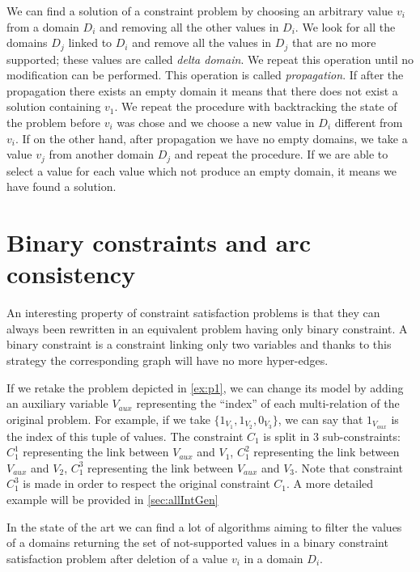 \documentclass{rapport}
\begin{document}
We can find a solution of a constraint problem by choosing an arbitrary value $v_i$ from a domain $D_i$ and removing all the other values in $D_i$. We look for all the domains $D_j$ linked to $D_i$ and remove all the values in $D_j$ that are no more supported; these values are called \textit{delta domain}. We repeat this operation until no modification can be performed. This operation is called \textit{propagation}. If after the propagation there exists an empty domain it means that there does not exist a solution containing $v_1$. We repeat the procedure with backtracking the state of the problem before $v_i$ was chose and we choose a new value in $D_i$ different from $v_i$. If on the other hand, after propagation we have no empty domains, we take a value $v_j$ from another domain $D_j$ and repeat the procedure. If we are able to select a value for each value which not produce an empty domain, it means we have found a solution.

\section{Binary constraints and arc consistency}

An interesting property of constraint satisfaction problems is that they can always been rewritten in an equivalent problem having only binary constraint. A binary constraint is a constraint linking only two variables and thanks to this strategy the corresponding graph will have no more hyper-edges.

\begin{example}
  If we retake the problem depicted in \cref{ex:p1}, we can change its model by adding an auxiliary variable $V_{aux}$ representing the ``index'' of each multi-relation of the original problem. For example, if we take $\{1_{V_1}, 1_{V_2}, 0_{V_3}\}$, we can say that $1_{V_{aux}}$ is the index of this tuple of values. The constraint $C_1$ is split in $3$ sub-constraints: $C_1^1$ representing the link between $V_{aux}$ and $V_1$, $C_1^2$ representing the link between $V_{aux}$ and $V_2$, $C_1^3$ representing the link between $V_{aux}$ and $V_3$. Note that constraint $C_1^3$ is made in order to respect the original constraint $C_1$. A more detailed example will be provided in \cref{sec:allIntGen}
\end{example}

In the state of the art we can find a lot of algorithms aiming to filter the values of a domains returning the set of not-supported values in a binary constraint satisfaction problem after deletion of a value $v_i$ in a domain $D_i$.
\end{document}
